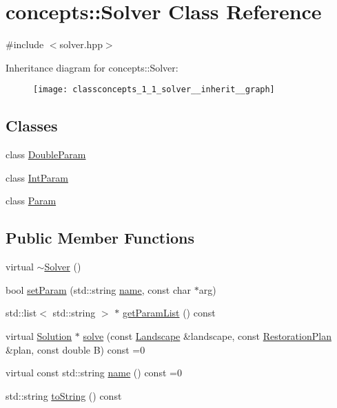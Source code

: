 \hypertarget{classconcepts_1_1_solver}{}\section{concepts\+:\+:Solver Class Reference}
\label{classconcepts_1_1_solver}


{\ttfamily \#include $<$solver.\+hpp$>$}



Inheritance diagram for concepts\+:\+:Solver\+:\nopagebreak
\begin{figure}[H]
\begin{center}
\leavevmode
\texttt{[image: classconcepts\_1\_1\_solver\_\_inherit\_\_graph]}
\end{center}
\end{figure}
\subsection*{Classes}
\begin{DoxyCompactItemize}
\item 
class \hyperlink{classconcepts_1_1_solver_1_1_double_param}{Double\+Param}
\item 
class \hyperlink{classconcepts_1_1_solver_1_1_int_param}{Int\+Param}
\item 
class \hyperlink{classconcepts_1_1_solver_1_1_param}{Param}
\end{DoxyCompactItemize}
\subsection*{Public Member Functions}
\begin{DoxyCompactItemize}
\item 
virtual \hyperlink{classconcepts_1_1_solver_a550134cf412d2c1c1b8c6eed1a477090}{$\sim$\+Solver} ()
\item 
bool \hyperlink{classconcepts_1_1_solver_a2158cd44bcaa736d828a1dcb49058db0}{set\+Param} (std\+::string \hyperlink{classconcepts_1_1_solver_ab995568318a506446228f45cab2fcce7}{name}, const char $\ast$arg)
\item 
std\+::list$<$ std\+::string $>$ $\ast$ \hyperlink{classconcepts_1_1_solver_a65cee6a06fd6c1439f3c17fb7e7fb42c}{get\+Param\+List} () const
\item 
virtual \hyperlink{class_solution}{Solution} $\ast$ \hyperlink{classconcepts_1_1_solver_af323ad29df1e7b87facd7dc007568c80}{solve} (const \hyperlink{class_landscape}{Landscape} \&landscape, const \hyperlink{class_restoration_plan}{Restoration\+Plan} \&plan, const double B) const =0
\item 
virtual const std\+::string \hyperlink{classconcepts_1_1_solver_ab995568318a506446228f45cab2fcce7}{name} () const =0
\item 
std\+::string \hyperlink{classconcepts_1_1_solver_a3f9ca298d2c2ccaa4e1c8337866b8021}{to\+String} () const
\end{DoxyCompactItemize}
